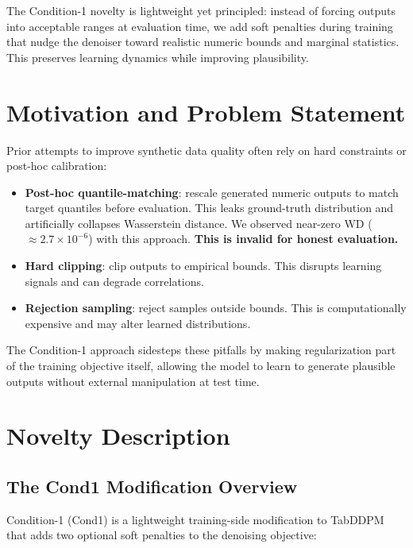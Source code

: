 \documentclass{article}
\begin{document}
The Condition-1 novelty is lightweight yet principled: instead of forcing outputs into acceptable ranges at evaluation time, we add soft penalties during training that nudge the denoiser toward realistic numeric bounds and marginal statistics. This preserves learning dynamics while improving plausibility.

\section{Motivation and Problem Statement}

Prior attempts to improve synthetic data quality often rely on hard constraints or post-hoc calibration:

\begin{itemize}
  \item \textbf{Post-hoc quantile-matching}: rescale generated numeric outputs to match target quantiles before evaluation. This leaks ground-truth distribution and artificially collapses Wasserstein distance. We observed near-zero WD ($\approx 2.7 \times 10^{-6}$) with this approach. \textbf{This is invalid for honest evaluation.}
  
  \item \textbf{Hard clipping}: clip outputs to empirical bounds. This disrupts learning signals and can degrade correlations.
  
  \item \textbf{Rejection sampling}: reject samples outside bounds. This is computationally expensive and may alter learned distributions.
\end{itemize}

The Condition-1 approach sidesteps these pitfalls by making regularization part of the training objective itself, allowing the model to learn to generate plausible outputs without external manipulation at test time.

\section{Novelty Description}

\subsection{The Cond1 Modification Overview}

Condition-1 (Cond1) is a lightweight training-side modification to TabDDPM that adds two optional soft penalties to the denoising objective:
\end{document}
